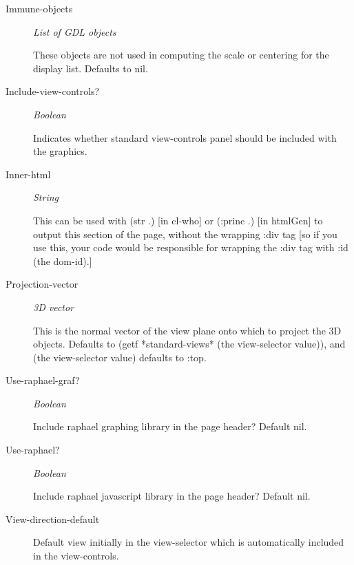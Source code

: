 \documentclass [11pt]{book}
\begin{document}
\begin{itemize}
\begin{description}
\item [Immune-objects]
\emph{List of GDL objects}

 These objects are not used in
computing the scale or centering for the display list.
Defaults to nil.




\item [Include-view-controls?]
\emph{Boolean}

 Indicates whether standard view-controls panel should be included with the graphics.




\item [Inner-html]
\emph{String}

 This can be used with (str .) [in cl-who] or (:princ .) [in htmlGen]
to output this section of the page, without the wrapping :div tag [so if you use this,
your code would be responsible for wrapping the :div tag with :id (the dom-id).]




\item [Projection-vector]
\emph{3D vector}

 This is the normal vector of the view plane onto
which to project the 3D objects. Defaults to
(getf *standard-views* (the view-selector value)),
and (the view-selector value) defaults to :top.




\item [Use-raphael-graf?]
\emph{Boolean}

 Include raphael graphing library in the page header?
Default nil.




\item [Use-raphael?]
\emph{Boolean}

 Include raphael javascript library in the page header?
Default nil.




\item [View-direction-default]

Default view initially in the view-selector which is
automatically included in the view-controls.





\end{description}
\end{itemize}
\end{document}
